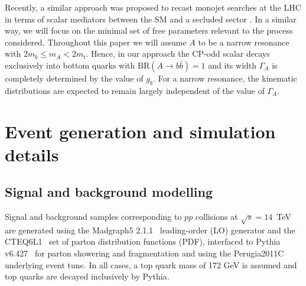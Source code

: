 \documentclass[preprintnumbers,superscriptaddress,nofootinbib,aps,prd,floatfix]{revtex4}
\newcommand{\BR} {\ensuremath{\mathrm{BR}}}
\begin{document}
Recently, a similar approach was proposed to recast monojet searches at the LHC in terms of scalar mediators between the SM and a secluded sector \cite{Buckley:2014fba,Harris:2014hga,Haisch:2015ioa,Khoze:2015sra}. In a similar way, we will focus on the minimal set of free parameters relevant to the process considered. Throughout this paper we will assume $A$ to be a narrow resonance with $2 m_b \leq m_A < 2m_t$. Hence, in our approach the CP-odd scalar decays exclusively into bottom quarks with $\BR(A\to b\bar{b})=1$ and its width $\Gamma_A$ is completely determined by the value of $g_b$. 
For a narrow resonance, the kinematic distributions are expected to remain largely independent of the value of $\Gamma_A$.

\section{Event generation and simulation details}
\label{sec:generation}

\subsection{Signal and background modelling}

Signal and background samples corresponding to $pp$ collisions at $\sqrt{s}=14$~TeV are generated using 
the {\sc Madgraph5} 2.1.1~\cite{Alwall:2011uj} leading-order (LO) generator and the  CTEQ6L1~\cite{Nadolsky:2008zw}  
set of parton distribution functions (PDF), interfaced to {\sc Pythia} v6.427~\cite{Sjostrand:2006za}  for parton 
showering and fragmentation and using the Perugia2011C~\cite{Skands:2010ak}  underlying event tune. In all cases, a top quark mass 
of 172 GeV is assumed and top quarks are decayed inclusively by {\sc Pythia}. 
\end{document}
